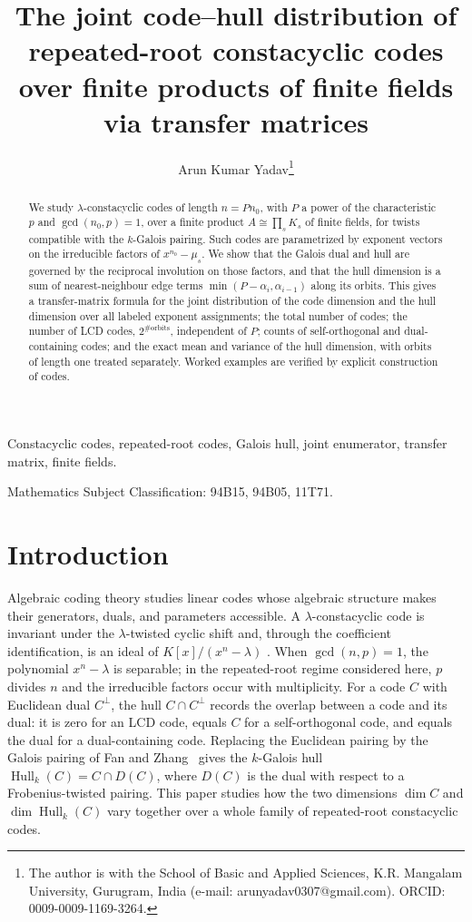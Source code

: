\documentclass[10pt,journal,draftclsnofoot,onecolumn]{IEEEtran}
\title{The joint code--hull distribution of repeated-root constacyclic codes
over finite products of finite fields via transfer matrices}
\author{Arun Kumar Yadav\thanks{The author is with the School of Basic and Applied Sciences, K.R. Mangalam University, Gurugram, India (e-mail: arunyadav0307@gmail.com). ORCID: 0009-0009-1169-3264.}}
\theoremstyle{definition}
\theoremstyle{remark}
\newcommand{\Hull}{\operatorname{Hull}}
\begin{document}
\maketitle

\begin{abstract}
We study \(\lambda\)-constacyclic codes of length \(n = P n_0\), with
\(P\) a power of the characteristic \(p\) and \(\gcd(n_0, p) = 1\), over a
finite product \(A \cong \prod_s K_s\) of finite fields, for twists
compatible with the \(k\)-Galois pairing. Such codes are parametrized by
exponent vectors on the irreducible factors of \(x^{n_0} - \mu_s\). We
show that the Galois dual and hull are governed by the reciprocal
involution on those factors, and that the hull dimension is a sum of
nearest-neighbour edge terms \(\min(P - \alpha_i, \alpha_{i-1})\) along
its orbits. This gives a transfer-matrix formula for the joint
distribution of the code dimension and the hull dimension over all
labeled exponent assignments; the total number of codes; the number of
LCD codes, \(2^{\#\mathrm{orbits}}\), independent of \(P\); counts of
self-orthogonal and dual-containing codes; and the exact mean and
variance of the hull dimension, with orbits of length one treated
separately. Worked examples are verified by explicit construction of
codes.
\end{abstract}

\begin{IEEEkeywords}
Constacyclic codes, repeated-root codes, Galois hull, joint enumerator, transfer matrix, finite fields.
\end{IEEEkeywords}

\noindent Mathematics Subject Classification: 94B15, 94B05, 11T71.

\section{Introduction}

Algebraic coding theory studies linear codes whose algebraic structure
makes their generators, duals, and parameters accessible. A
\(\lambda\)-constacyclic code is invariant under the
\(\lambda\)-twisted cyclic shift and, through the coefficient
identification, is an ideal of \(K[x]/(x^n-\lambda)\)
\cite{HP2003, MS1977}. When \(\gcd(n,p)=1\), the polynomial
\(x^n-\lambda\) is separable; in the repeated-root regime considered
here, \(p\) divides \(n\) and the irreducible factors occur with
multiplicity. For a code \(C\) with Euclidean dual \(C^\perp\), the
hull \(C \cap C^\perp\) records the overlap between a code and its
dual: it is zero for an LCD code, equals \(C\) for a self-orthogonal
code, and equals the dual for a dual-containing code. Replacing the
Euclidean pairing by the Galois pairing of Fan and
Zhang~\cite{FZ2017} gives the \(k\)-Galois hull
\(\Hull_k(C) = C \cap D(C)\), where \(D(C)\) is the dual with respect
to a Frobenius-twisted pairing. This paper studies how the two
dimensions \(\dim C\) and \(\dim \Hull_k(C)\) vary together over a
whole family of repeated-root constacyclic codes.
\end{document}
